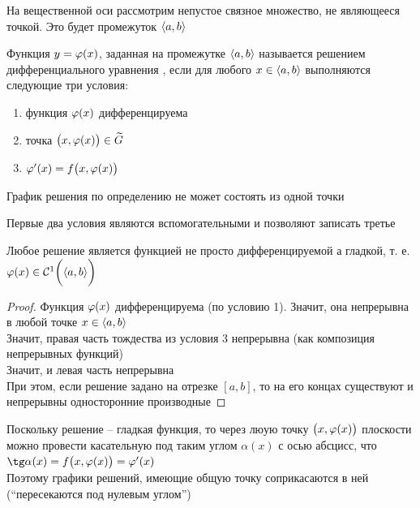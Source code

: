 На вещественной оси рассмотрим непустое связное множество, не являющееся точкой. Это будет промежуток $ \braket{a, b} $

\begin{definition}
    Функция $ y = \vphi(x) $, заданная на промежутке $ \braket{a, b} $ называется решением дифференциального уравнения , если для любого $ x \in \braket{a, b} $ выполняются следующие три условия:
    \begin{enumerate}
        \item функция $ \vphi(x) $ дифференцируема
        \item точка $ \big( x, \vphi(x) \big) \in \vawe{G} $
        \item $ \vphi'(x) = f\big( x, \vphi(x) \big) $
    \end{enumerate}
\end{definition}

\begin{remark}
	График решения по определению не может состоять из одной точки
\end{remark}

\begin{remark}
	Первые два условия являются вспомогательными и позволяют записать третье
\end{remark}

\begin{remark}
    Любое решение является функцией не просто дифференцируемой а гладкой, т. е. $ \vphi(x) \in \Cont[1]{\braket{a, b}} $
\end{remark}

\begin{proof}
    Функция $ \vphi(x) $ дифференцируема (по условию 1). Значит, она непрерывна в любой точке $ x \in \braket{a, b} $ \\
    Значит, правая часть тождества из условия 3 непрерывна (как композиция непрерывных функций) \\
    Значит, и левая часть непрерывна \\
    При этом, если решение задано на отрезке $ [a, b] $, то на его концах существуют и непрерывны односторонние производные
\end{proof}

\begin{definition}
	Поскольку решение -- гладкая функция, то через люую точку $ \big( x, \vphi(x) \big) $ плоскости можно провести касательную под таким углом $ \alpha(x) $ с осью абсцисс, что $ \tg \alpha(x) = f \big(x, \vphi(x) \big) = \vphi'(x) $ \\
    Поэтому графики решений, имеющие общую точку соприкасаются в ней (``пересекаются под нулевым углом'')
\end{definition}


